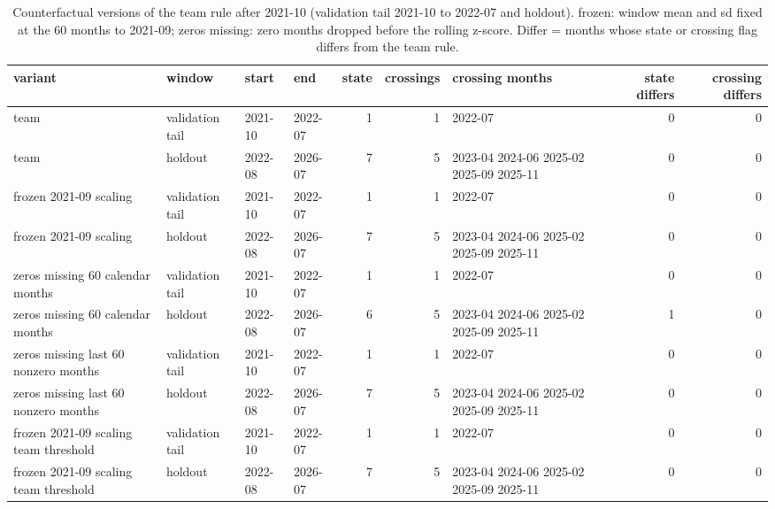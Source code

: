 \begin{table}[H]
\centering\small
\caption{Counterfactual versions of the team rule after 2021-10 (validation tail 2021-10 to 2022-07 and holdout). frozen: window mean and sd fixed at the 60 months to 2021-09; zeros missing: zero months dropped before the rolling z-score. Differ = months whose state or crossing flag differs from the team rule.}
\label{tab:m1_zero_cf}
\begin{adjustbox}{max width=\linewidth}
\begin{tabular}{llllrrlrr}
\toprule
variant & window & start & end & state & crossings & crossing months & state differs & crossing differs \\
\midrule
team & validation tail & 2021-10 & 2022-07 & 1 & 1 & 2022-07 & 0 & 0 \\
team & holdout & 2022-08 & 2026-07 & 7 & 5 & 2023-04 2024-06 2025-02 2025-09 2025-11 & 0 & 0 \\
frozen 2021-09 scaling & validation tail & 2021-10 & 2022-07 & 1 & 1 & 2022-07 & 0 & 0 \\
frozen 2021-09 scaling & holdout & 2022-08 & 2026-07 & 7 & 5 & 2023-04 2024-06 2025-02 2025-09 2025-11 & 0 & 0 \\
zeros missing 60 calendar months & validation tail & 2021-10 & 2022-07 & 1 & 1 & 2022-07 & 0 & 0 \\
zeros missing 60 calendar months & holdout & 2022-08 & 2026-07 & 6 & 5 & 2023-04 2024-06 2025-02 2025-09 2025-11 & 1 & 0 \\
zeros missing last 60 nonzero months & validation tail & 2021-10 & 2022-07 & 1 & 1 & 2022-07 & 0 & 0 \\
zeros missing last 60 nonzero months & holdout & 2022-08 & 2026-07 & 7 & 5 & 2023-04 2024-06 2025-02 2025-09 2025-11 & 0 & 0 \\
frozen 2021-09 scaling team threshold & validation tail & 2021-10 & 2022-07 & 1 & 1 & 2022-07 & 0 & 0 \\
frozen 2021-09 scaling team threshold & holdout & 2022-08 & 2026-07 & 7 & 5 & 2023-04 2024-06 2025-02 2025-09 2025-11 & 0 & 0 \\
\bottomrule
\end{tabular}
\end{adjustbox}
\end{table}
